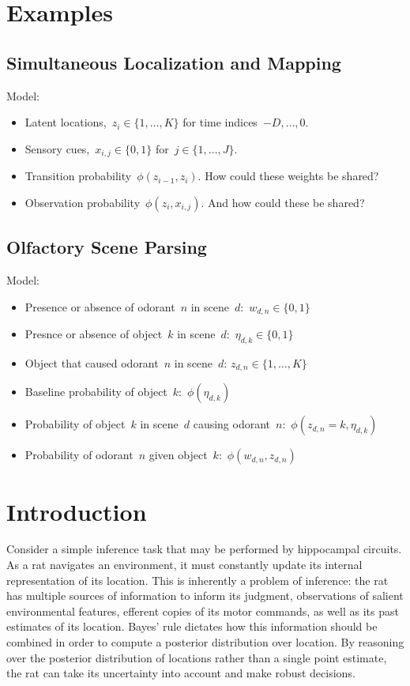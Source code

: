 \section{Examples}


\subsection{Simultaneous Localization and Mapping}

Model:
\begin{itemize}
\item Latent locations,~$z_i \in \{1, \ldots, K\}$ for time indices~$-D, \ldots, 0$.
\item Sensory cues,~$x_{i,j} \in \{0,1\}$ for~$j \in \{1, \ldots, J\}$.
\item Transition probability~$\phi(z_{i-1}, z_i)$. How could these weights be shared?
\item Observation probability~$\phi(z_{i}, x_{i,j})$. And how could these be shared?
\end{itemize}

\subsection{Olfactory Scene Parsing}


Model:
\begin{itemize}
\item Presence or absence of odorant~$n$ in scene~$d$:~$w_{d,n} \in \{0,1\}$
\item Presnce or absence of object~$k$ in scene~$d$:~$\eta_{d,k} \in \{0,1\}$
\item Object that caused odorant~$n$ in scene~$d$: $z_{d,n} \in \{1, \ldots, K\}$ 
\item Baseline probability of object~$k$:~$\phi(\eta_{d,k})$
\item Probability of object~$k$ in scene~$d$ causing odorant~$n$:~$\phi(z_{d,n}=k, \eta_{d,k})$
\item Probability of odorant~$n$ given object~$k$:~$\phi(w_{d,n}, z_{d,n})$
\end{itemize}

\clearpage
\section{Introduction} 
Consider a simple inference task that may be performed by hippocampal circuits. 
As a rat navigates an environment, it must constantly update its internal 
representation of its location. This is inherently a problem of inference: 
the rat has multiple sources of information to inform its judgment, observations
of salient environmental features, efferent copies of its motor commands, as
well as its past estimates of its location. Bayes' rule dictates how this 
information should be combined in order to compute a posterior distribution 
over location. By reasoning over the posterior distribution of locations 
rather than a single point estimate, the rat can take its uncertainty into 
account and make robust decisions. 

